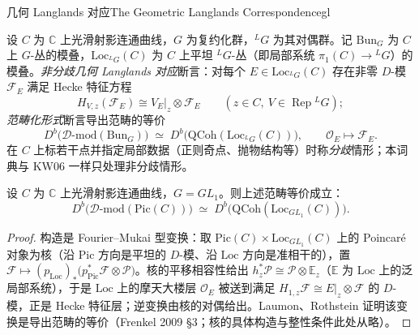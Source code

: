 \begin{centry}{几何 Langlands 对应}{The Geometric Langlands Correspondence}{gl}

\begin{definition}
设 $C$ 为 $\mathbb{C}$ 上光滑射影连通曲线，$G$ 为复约化群，${}^{L}G$ 为其对偶群。记 $\mathrm{Bun}_G$ 为 $C$ 上 $G$-丛的模叠，$\mathrm{Loc}_{{}^{L}G}(C)$ 为 $C$ 上平坦 ${}^{L}G$-丛（即局部系统 $\pi_{1}(C)\to{}^{L}G$）的模叠。\emph{非分歧几何 Langlands 对应}断言：对每个 $E\in\mathrm{Loc}_{{}^{L}G}(C)$ 存在非零 $D$-模 $\mathcal{F}_{E}$ 满足 Hecke 特征方程
\[
H_{V,z}(\mathcal{F}_{E})\cong V_{E}|_{z}\otimes\mathcal{F}_{E}\qquad(z\in C,\ V\in\operatorname{Rep}{}^{L}G);
\]
\emph{范畴化形式}断言导出范畴的等价
\[
D^{b}\bigl(\mathcal{D}\text{-mod}(\mathrm{Bun}_G)\bigr)\;\simeq\;D^{b}\bigl(\mathrm{QCoh}(\mathrm{Loc}_{{}^{L}G}(C))\bigr),\qquad \mathcal{O}_{E}\mapsto\mathcal{F}_{E}.
\]
在 $C$ 上标若干点并指定局部数据（正则奇点、抛物结构等）时称\emph{分歧}情形；本词典与 KW06 一样只处理非分歧情形。
\end{definition}

\begin{theorem}[$GL_1$：几何类域论]
设 $C$ 为 $\mathbb{C}$ 上光滑射影连通曲线，$G=GL_1$。则上述范畴等价成立：
\[
D^{b}\bigl(\mathcal{D}\text{-mod}(\mathrm{Pic}(C))\bigr)\;\simeq\;D^{b}\bigl(\mathrm{QCoh}(\mathrm{Loc}_{GL_1}(C))\bigr).
\]
\end{theorem}
\begin{proof}
构造是 Fourier--Mukai 型变换：取 $\mathrm{Pic}(C)\times\mathrm{Loc}_{GL_1}(C)$ 上的 Poincar\'e 对象为核（沿 $\mathrm{Pic}$ 方向是平坦的 $D$-模、沿 $\mathrm{Loc}$ 方向是准相干的），置 $\mathcal{F}\mapsto (p_{\mathrm{Loc}})_{*}\bigl(p_{\mathrm{Pic}}^{*}\mathcal{F}\otimes\mathcal{P}\bigr)$。核的平移相容性给出 $h_z^{*}\mathcal{P}\cong\mathcal{P}\otimes\mathbb{E}_{z}$（$\mathbb{E}$ 为 $\mathrm{Loc}$ 上的泛局部系统），于是 $\mathrm{Loc}$ 上的摩天大楼层 $\mathcal{O}_{E}$ 被送到满足 $H_{1,z}\mathcal{F}\cong E|_{z}\otimes\mathcal{F}$ 的 $D$-模，正是 Hecke 特征层；逆变换由核的对偶给出。Laumon、Rothstein 证明该变换是导出范畴的等价（Frenkel 2009 §3；核的具体构造与整性条件此处从略）。
\end{proof}


\end{centry}
